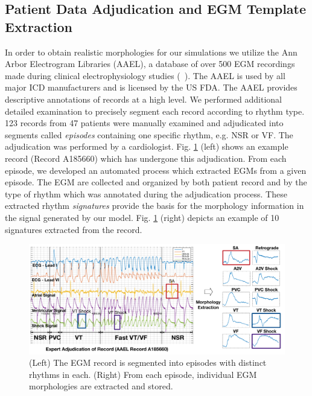\subsection{Patient Data Adjudication and EGM Template Extraction}
In order to obtain realistic morphologies for our simulations we utilize the Ann Arbor Electrogram Libraries (AAEL), a database of over 500 EGM recordings made during clinical electrophysiology studies (~\cite{AAEL}). 
The AAEL is used by all major ICD manufacturers and is licensed by the US FDA. 
The AAEL provides descriptive annotations of records at a high level.
We performed additional detailed examination to precisely segment each record according to rhythm type.
123 records from 47 patients were manually examined and adjudicated into segments called \emph{episodes} containing one specific rhythm, e.g. NSR or VF. 
The adjudication was performed by a cardiologist.
Fig. \ref{fig:adjudication} (left) shows an example record (Record A185660) which has undergone this adjudication.
From each episode, we developed an automated process which extracted EGMs from a given episode. 
The EGM are collected and organized by both patient record and by the type of rhythm which was annotated during the adjudication process.
These extracted rhythm \emph{signatures} provide the basis for the morphology information in the signal generated by our model.
Fig. \ref{fig:adjudication} (right) depicts an example of 10 signatures extracted from the record. 

\begin{figure}[t]
	\centering
	\includegraphics[scale=0.35]{figures/figadjudication.pdf}
	\caption{\small  (Left) The EGM record is segmented into episodes with distinct rhythms in each. (Right) From each episode, individual EGM morphologies are extracted and stored.
	}
	\label{fig:adjudication}
\end{figure}

